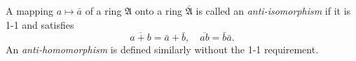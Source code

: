 A mapping $a \mapsto \bar{a}$ of a ring $\mathfrak{A}$ onto a ring $\bar{\mathfrak{A}}$ is called an \emph{anti-isomorphism} if it is 1-1 and satisfies
$$\overline{a + b} = \bar{a} + \bar{b}, \quad \overline{ab} = \bar{b}\bar{a}.$$
An \emph{anti-homomorphism} is defined similarly without the 1-1 requirement.
